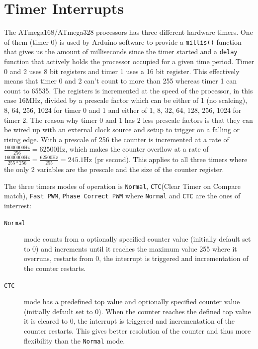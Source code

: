 \documentclass[a4paper, oneside, final]{memoir}
\begin{document}
\section{Timer Interrupts}
\label{sec:timer-interrupts}



The ATmega168/ATmega328 processors has three different hardware
timers. One of them (timer 0) is used by Arduino software to provide a
\texttt{millis()} function that gives us the amount of milliseconds
since the timer started and a \texttt{delay} function that actively
holds the processor occupied for a given time period. Timer 0 and 2
uses 8 bit registers and timer 1 uses a 16 bit register. This
effectively means that timer 0 and 2 can't count to more than 255
whereas timer 1 can count to 65535. The registers is incremented at
the speed of the processor, in this case 16MHz, divided by a prescale
factor which can be either of 1 (no scaleing), 8, 64, 256, 1024 for
timer 0 and 1 and either of 1, 8, 32, 64, 128, 256, 1024 for timer
2. The reason why timer 0 and 1 has 2 less prescale factors is that
they can be wired up with an external clock source and setup to
trigger on a falling or rising edge. With a prescale of 256 the
counter is incremented at a rate of $\frac{16000000\mathrm{Hz}}{256} =
62500\mathrm{Hz}$, which makes the counter overflow at a rate of
$\frac{16000000\mathrm{Hz}}{255*256} = \frac{62500\mathrm{Hz}}{255} =
245.1\mathrm{Hz}$ (pr second). This applies to all three timers where the only
2 variables are the prescale and the size of the counter register.

The three timers modes of operation is \texttt{Normal},
\texttt{CTC}(Clear Timer on Compare match), \texttt{Fast PWM},
\texttt{Phase Correct PWM} where \texttt{Normal} and \texttt{CTC} are
the ones of interrest:

\begin{description}
\item[\texttt{Normal}] mode counts from a optionally specified counter
  value (initially default set to 0) and increments until it reaches
  the maximum value 255 where it overruns, restarts from 0, the
  interrupt is triggered and incrementation of the counter
  restarts.

\item[\texttt{CTC}] mode has a predefined top value and optionally
  specified counter value (initially default set to 0). When the
  counter reaches the defined top value it is cleared to 0, the
  interrupt is triggered and incrementation of the counter
  restarts. This gives better resolution of the counter and thus more
  flexibility than the \texttt{Normal} mode.
\end{description}
\end{document}
